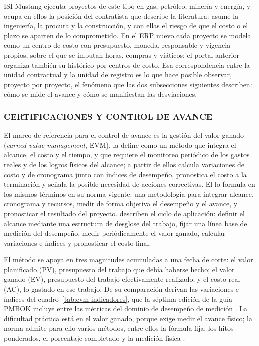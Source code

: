 ISI Mustang ejecuta proyectos de este tipo en gas, petróleo, minería y energía, y ocupa en ellos la posición del contratista que describe la literatura: asume la ingeniería, la procura y la construcción, y con ellas el riesgo de que el costo o el plazo se aparten de lo comprometido. En el ERP nuevo cada proyecto se modela como un centro de costo con presupuesto, moneda, responsable y vigencia propios, sobre el que se imputan horas, compras y viáticos; el portal anterior organiza también su histórico por centros de costo. Esa correspondencia entre la unidad contractual y la unidad de registro es lo que hace posible observar, proyecto por proyecto, el fenómeno que las dos subsecciones siguientes describen: cómo se mide el avance y cómo se manifiestan las desviaciones.

\subsubsection{CERTIFICACIONES Y CONTROL DE AVANCE}

El marco de referencia para el control de avance es la gestión del valor ganado (\textit{earned value management}, EVM). \textcite{Anbari2003} la define como un método que integra el alcance, el costo y el tiempo, y que requiere el monitoreo periódico de los gastos reales y de los logros físicos del alcance; a partir de ellos calcula variaciones de costo y de cronograma junto con índices de desempeño, pronostica el costo a la terminación y señala la posible necesidad de acciones correctivas. El \textcite{PMI2019EVM} lo formula en los mismos términos en su norma vigente: una metodología para integrar alcance, cronograma y recursos, medir de forma objetiva el desempeño y el avance, y pronosticar el resultado del proyecto. \textcite{Fleming2010} describen el ciclo de aplicación: definir el alcance mediante una estructura de desglose del trabajo, fijar una línea base de medición del desempeño, medir periódicamente el valor ganado, calcular variaciones e índices y pronosticar el costo final.

El método se apoya en tres magnitudes acumuladas a una fecha de corte: el valor planificado (PV), presupuesto del trabajo que debía haberse hecho; el valor ganado (EV), presupuesto del trabajo efectivamente realizado; y el costo real (AC), lo gastado en ese trabajo. De su comparación derivan las variaciones e índices del cuadro~\ref{tab:evm-indicadores}, que la séptima edición de la guía PMBOK incluye entre las métricas del dominio de desempeño de medición \parencite{PMI2021}. La dificultad práctica está en el valor ganado, porque exige medir el avance físico; la norma admite para ello varios métodos, entre ellos la fórmula fija, los hitos ponderados, el porcentaje completado y la medición física \parencite{PMI2019EVM}.

